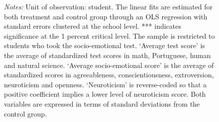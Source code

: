 \documentclass[11pt,a4paper]{article}
\begin{document}
\begin{figure}[htbp]
    \centering
    \begin{minipage}{0.9\textwidth}
        \footnotesize{\textit{Notes:} Unit of observation: student. The linear fits are estimated for both treatment and control group through an OLS regression with standard errors clustered at the school level. *** indicates significance at the 1 percent critical level. The sample is restricted to students who took the socio-emotional test. `Average test score' is the average of standardized test scores in math, Portuguese, human and natural science. `Average socio-emotional score' is the average of standardized scores in agreeableness, conscientiousness, extroversion, neuroticism and openness. `Neuroticism' is reverse-coded so that a positive coefficient implies a lower level of neuroticism score. Both variables are expressed in terms of standard deviations from the control group.}
    \end{minipage}
        
\end{figure}
\end{document}
